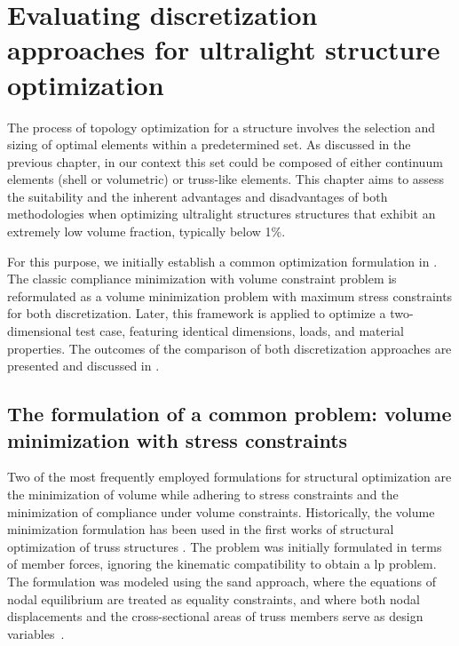 \setchapterpreamble[u]{\margintoc}
\chapter{Evaluating discretization approaches for ultralight structure optimization}
The process of topology optimization for a structure involves the selection and sizing of optimal elements within a predetermined set. As discussed in the previous chapter, in our context this set could be composed of either continuum elements (shell or volumetric) or truss-like elements. This chapter aims to assess the suitability and the inherent advantages and disadvantages of both methodologies when optimizing ultralight structures \ie structures that exhibit  an extremely low volume fraction, typically below 1\%. 

For this purpose, we initially establish a common optimization formulation in . The classic compliance minimization with volume constraint problem is reformulated as a volume minimization problem with maximum stress constraints for both discretization. Later, this framework is applied to optimize a two-dimensional test case, featuring identical dimensions, loads, and material properties. The outcomes of the comparison of both discretization approaches are presented and discussed in . 

\section{The formulation of a common problem: volume minimization with stress constraints} \label{sec:03_common_prob}
Two of the most frequently employed formulations for structural optimization are the minimization of volume while adhering to stress constraints and the minimization of compliance under volume constraints. Historically, the volume minimization formulation has been used in the first works of structural optimization of truss structures . The problem was initially formulated in terms of member forces, ignoring the kinematic compatibility to obtain a \gls{lp} problem. The formulation was modeled using the \acrfull{sand} approach, where the equations of nodal equilibrium are treated as equality constraints, and where both nodal displacements and the cross-sectional areas of truss members serve as design variables~. 

